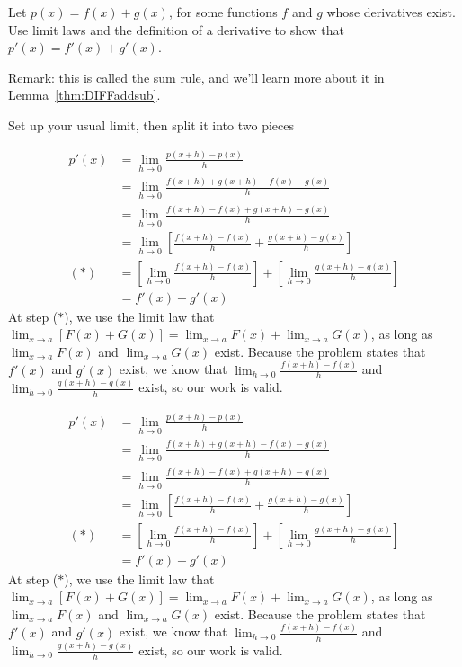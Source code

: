 \begin{question}Let $p(x)=f(x)+g(x)$, for some functions $f$ and $g$ whose derivatives exist. Use limit laws and the definition of a derivative to show that $p'(x)=f'(x)+g'(x)$.

Remark: this is called the sum rule, and we'll learn more about it in Lemma~\ref*{thm:DIFFaddsub}.
\end{question}
\begin{hint} Set up your usual limit, then split it into two pieces
\end{hint}
\begin{answer}\begin{align*}
p'(x) &= \lim_{h \rightarrow 0} \frac{p(x+h)-p(x)}{h}\\
&= \lim_{h \rightarrow 0} \frac{f(x+h)+g(x+h)-f(x)-g(x)}{h}\\
&= \lim_{h \rightarrow 0} \frac{f(x+h)-f(x)+g(x+h)-g(x)}{h}\\
&= \lim_{h \rightarrow 0} \left[\frac{f(x+h)-f(x)}{h}+
\frac{g(x+h)-g(x)}{h}\right]\\
(*)&= \left[\lim_{h \rightarrow 0} \frac{f(x+h)-f(x)}{h}\right]+ \left[\lim_{h \rightarrow 0}
\frac{g(x+h)-g(x)}{h}\right]\\
&= f'(x)+g'(x)
\end{align*}
At step ($*$), we use the limit law that $\displaystyle\lim_{x \rightarrow a} \left[F(x)+G(x)\right] = \displaystyle\lim_{x \rightarrow a} F(x)+\displaystyle\lim_{x \rightarrow a}G(x)$, as long as  $\displaystyle\lim_{x \rightarrow a} F(x)$ and $\displaystyle\lim_{x \rightarrow a}G(x)$ exist. Because the problem states that $f'(x)$ and $g'(x)$ exist, we know that $\displaystyle\lim_{h \rightarrow 0} \frac{f(x+h)-f(x)}{h}$ and $\displaystyle\lim_{h \rightarrow 0}
\frac{g(x+h)-g(x)}{h}$ exist, so our work is valid.
\end{answer}
\begin{solution}
\begin{align*}
p'(x) &= \lim_{h \rightarrow 0} \frac{p(x+h)-p(x)}{h}\\
&= \lim_{h \rightarrow 0} \frac{f(x+h)+g(x+h)-f(x)-g(x)}{h}\\
&= \lim_{h \rightarrow 0} \frac{f(x+h)-f(x)+g(x+h)-g(x)}{h}\\
&= \lim_{h \rightarrow 0}\left[ \frac{f(x+h)-f(x)}{h}+
\frac{g(x+h)-g(x)}{h}\right]\\
(*)&= \left[\lim_{h \rightarrow 0} \frac{f(x+h)-f(x)}{h}\right]+ \left[\lim_{h \rightarrow 0}
\frac{g(x+h)-g(x)}{h}\right]\\
&= f'(x)+g'(x)
\end{align*}
At step ($*$), we use the limit law that $\displaystyle\lim_{x \rightarrow a} \left[F(x)+G(x)\right] = \displaystyle\lim_{x \rightarrow a} F(x)+\displaystyle\lim_{x \rightarrow a}G(x)$, as long as  $\displaystyle\lim_{x \rightarrow a} F(x)$ and $\displaystyle\lim_{x \rightarrow a}G(x)$ exist. Because the problem states that $f'(x)$ and $g'(x)$ exist, we know that $\displaystyle\lim_{h \rightarrow 0} \frac{f(x+h)-f(x)}{h}$ and $\displaystyle\lim_{h \rightarrow 0}
\frac{g(x+h)-g(x)}{h}$ exist, so our work is valid.
\end{solution}


